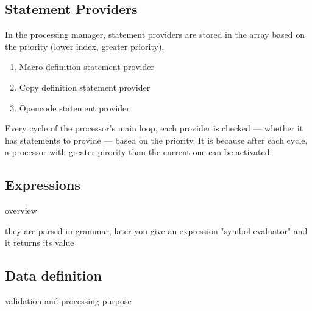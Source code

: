 \subsection{Statement Providers}

In the processing manager, statement providers are stored in the array based on the priority (lower index, greater priority).

\begin{enumerate}
	\item Macro definition statement provider
	\item Copy definition statement provider
	\item Opencode statement provider
\end{enumerate}

Every cycle of the processor's main loop, each provider is checked --- whether it has statements to provide --- based on the priority. It is because after each cycle, a processor with greater pirority than the current one can be activated.





\subsection{Expressions}
overview

they are parsed in grammar, later you give an expression "symbol evaluator" and it returns its value



\subsection{Data definition}

validation and processing purpose